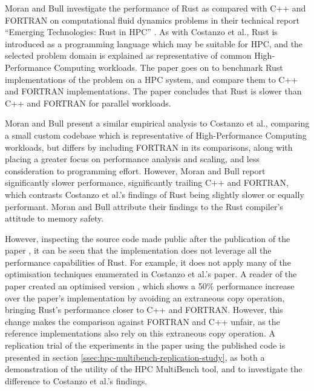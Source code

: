 Moran and Bull \cite{moranEmergingTechnologiesRust2023} investigate the performance of Rust as compared with C++ and FORTRAN on computational fluid dynamics problems in their technical report ``Emerging Technologies: Rust in HPC'' \cite{moranEmergingTechnologiesRust2023}. As with Costanzo et al., Rust is introduced as a programming language which may be suitable for HPC, and the selected problem domain is explained as representative of common High-Performance Computing workloads. The paper goes on to benchmark Rust implementations of the problem on a HPC system, and compare them to C++ and FORTRAN implementations. The paper concludes that Rust is slower than C++ and FORTRAN for parallel workloads.

Moran and Bull present a similar empirical analysis to Costanzo et al., comparing a small custom codebase which is representative of High-Performance Computing workloads, but differs by including FORTRAN in its comparisons, along with placing a greater focus on performance analysis and scaling, and less consideration to programming effort. However, Moran and Bull report significantly slower performance, significantly trailing C++ and FORTRAN, which contrasts Costanzo et al.'s findings of Rust being slightly slower or equally performant. Moran and Bull attribute their findings to the Rust compiler's attitude to memory safety.

However, inspecting the source code made public after the publication of the paper \cite{Lmoran94Eurocc_cfdCFD}, it can be seen that the implementation does not leverage all the performance capabilities of Rust. For example, it does not apply many of the optimisation techniques enumerated in Costanzo et al.'s paper. A reader of the paper created an optimised version  \cite{moranPaperFalse} \cite{phazer99HerePlayground2023}, which shows a 50\% performance increase over the paper's implementation by avoiding an extraneous copy operation, bringing Rust's performance closer to C++ and FORTRAN. However, this change makes the comparison against FORTRAN and C++ unfair, as the reference implementations also rely on this extraneous copy operation. A replication trial of the experiments in the paper using the published code is presented in section \ref{ssec:hpc-multibench-replication-study}, as both a demonstration of the utility of the HPC MultiBench tool, and to investigate the difference to Costanzo et al.'s findings.


